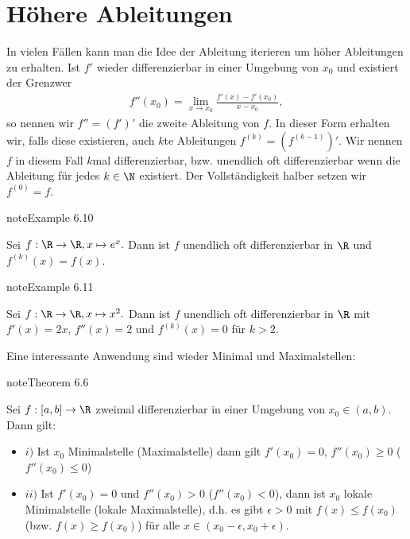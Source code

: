 \documentclass[letterpaper,10pt,english]{jupyterBook}
\begin{document}
\section{Höhere Ableitungen}
\label{\detokenize{differential/hoehereOrdnung:hohere-ableitungen}}\label{\detokenize{differential/hoehereOrdnung::doc}}
In vielen Fällen kann man die Idee der Ableitung iterieren um höher Ableitungen zu erhalten. Ist \(f'\) wieder differenzierbar in einer Umgebung von \(x_0\) und existiert der Grenzwer
\begin{equation*}
\begin{split} f''(x_0) = \lim_{x \rightarrow x_0} \frac{f'(x) - f'(x_0)}{x-x_0} ,\end{split}
\end{equation*}
so nennen wir \(f'' = (f')'\) die zweite Ableitung von \(f\). In dieser Form erhalten wir, falls diese existieren, auch \(k\)\sphinxhyphen{}te Ableitungen \(f^{(k)}=(f^{(k-1)})'\). Wir nennen \(f\) in diesem Fall \(k\)\sphinxhyphen{}mal differenzierbar, bzw. unendlich oft differenzierbar wenn die Ableitung für jedes \(k \in \N\) existiert. Der Vollständigkeit halber setzen wir \(f^{(0)} = f\).
\label{differential/hoehereOrdnung:example-0}
\begin{sphinxadmonition}{note}{Example 6.10}



Sei \(f: \R \rightarrow \R, x \mapsto e^x.\) Dann ist \(f\) unendlich oft differenzierbar in \(\R\) und \(f^{(k)}(x)=f(x)\).
\end{sphinxadmonition}
\label{differential/hoehereOrdnung:example-1}
\begin{sphinxadmonition}{note}{Example 6.11}



Sei \(f: \R \rightarrow \R, x \mapsto x^2.\) Dann ist \(f\) unendlich oft differenzierbar in \(\R\) mit \(f'(x)=2x\), \(f''(x)=2\) und \(f^{(k)}(x)=0\) für \(k > 2\).
\end{sphinxadmonition}

Eine interessante Anwendung sind wieder Minimal\sphinxhyphen{} und Maximalstellen:
\label{differential/hoehereOrdnung:theorem-2}
\begin{sphinxadmonition}{note}{Theorem 6.6}



Sei \(f:[a,b]\rightarrow \R\) zweimal differenzierbar in einer Umgebung von \(x_0 \in (a,b)\). Dann gilt:
\begin{itemize}
\item {} 
\(i)\) Ist \(x_0\) Minimalstelle (Maximalstelle) dann gilt \(f'(x_0) = 0\), \(f''(x_0) \geq 0\) (\(f''(x_0) \leq 0\))

\item {} 
\(ii)\) Ist \(f'(x_0) = 0\) und \(f''(x_0) > 0\) (\(f''(x_0) < 0\)), dann ist \(x_0\) lokale Minimalstelle (lokale Maximalstelle), d.h. es gibt \(\epsilon > 0\) mit \(f(x) \leq f(x_0)\) (bzw. \(f(x) \geq f(x_0)\)) für alle \(x\in (x_0-\epsilon, x_0+\epsilon)\).

\end{itemize}
\end{sphinxadmonition}
\end{document}
